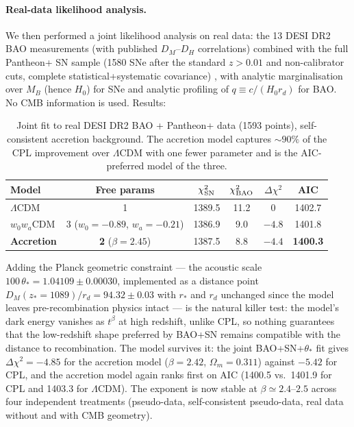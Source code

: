 \documentclass[11pt]{article}
\begin{document}
\paragraph{Real-data likelihood analysis.} We then performed a joint likelihood analysis on real data: the 13 DESI DR2 BAO measurements (with published $D_M$--$D_H$ correlations) \cite{DESIDR2BAO} combined with the full Pantheon+ SN sample (1580 SNe after the standard $z>0.01$ and non-calibrator cuts, complete statistical+systematic covariance) \cite{Pantheon}, with analytic marginalisation over $M_B$ (hence $H_0$) for SNe and analytic profiling of $q \equiv c/(H_0 r_d)$ for BAO. No CMB information is used. Results:

\begin{table}[h]
\centering
\begin{tabular}{lccccc}
\toprule
Model & Free params & $\chi^2_{\rm SN}$ & $\chi^2_{\rm BAO}$ & $\Delta\chi^2$ & AIC \\
\midrule
$\Lambda$CDM & 1 & 1389.5 & 11.2 & $0$ & 1402.7 \\
$w_0w_a$CDM & 3 ($w_0{=}-0.89$, $w_a{=}-0.21$) & 1386.9 & 9.0 & $-4.8$ & 1401.8 \\
\textbf{Accretion} & \textbf{2} ($\beta = 2.45$) & 1387.5 & 8.8 & $-4.4$ & \textbf{1400.3} \\
\bottomrule
\end{tabular}
\caption{Joint fit to real DESI DR2 BAO + Pantheon+ data (1593 points), self-consistent accretion background. The accretion model captures $\sim 90\%$ of the CPL improvement over $\Lambda$CDM with one fewer parameter and is the AIC-preferred model of the three.}
\label{tab:real}
\end{table}

Adding the Planck geometric constraint --- the acoustic scale $100\,\theta_* = 1.04109 \pm 0.00030$, implemented as a distance point $D_M(z_*{=}1089)/r_d = 94.32 \pm 0.03$ with $r_*$ and $r_d$ unchanged since the model leaves pre-recombination physics intact --- is the natural killer test: the model's dark energy vanishes as $t^{\beta}$ at high redshift, unlike CPL, so nothing guarantees that the low-redshift shape preferred by BAO+SN remains compatible with the distance to recombination. The model survives it: the joint BAO+SN+$\theta_*$ fit gives $\Delta\chi^2 = -4.85$ for the accretion model ($\beta = 2.42$, $\Omega_m = 0.311$) against $-5.42$ for CPL, and the accretion model again ranks first on AIC (1400.5 vs.\ 1401.9 for CPL and 1403.3 for $\Lambda$CDM). The exponent is now stable at $\beta \simeq 2.4$--$2.5$ across four independent treatments (pseudo-data, self-consistent pseudo-data, real data without and with CMB geometry).
\end{document}
